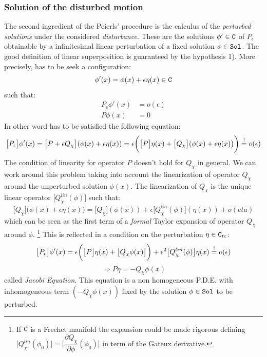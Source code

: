 \documentclass[Main]{subfiles}
\begin{document}
	\subsubsection{Solution of the disturbed motion}
		The second ingredient of the Peierls' procedure is the calculus of the \emph{perturbed solutions} under the considered \emph{disturbance}.
		 These are the solutions $\phi'\in \mathtt{C}$ of $P_\epsilon$ obtainable by a infinitesimal linear perturbation of a fixed solution $\phi \in \mathtt{Sol}$. The good definition of linear superposition is guaranteed by the hypothesis 1).
		More precisely, has to be seek a configuration:
			\begin{displaymath}
					\phi'(x) = \phi(x) + \epsilon \eta(x) \in \mathtt{C}
			\end{displaymath}
		such that:
			\begin{align*} 
				P_\epsilon \phi'(x) &= o(\epsilon)  \\ 
				P \phi(x) &= 0
			\end{align*}
		In other word has to be satisfied the following equation:
		\begin{displaymath}
			\big[P_\epsilon\big] \phi'(x) = \big[ P + \epsilon Q_\chi		\big]( \phi(x) + \epsilon \eta(x)) 
			= \epsilon \biggr( \big[P\big] \eta(x) + \big[Q_\chi \big]( \phi(x) + \epsilon \eta(x)\big)\biggr) \overset{!}{=} o(\epsilon)			
		\end{displaymath}
		The condition of linearity for operator $P$ doesn't hold for $Q_\chi$ in general.
		We can work around this problem taking into account the linearization\cite[pag. 31]{Khavkine2014} of operator $Q_\chi$ around the unperturbed solution $\phi(x)$. 
		The linearization of $Q_\chi$ is the unique linear operator $\big[Q_\chi^{lin}(\phi) \big]$ such that:
		\begin{displaymath}
			\big[Q_\chi \big]( \phi(x) + \epsilon \eta(x)\big)= \big[Q_\chi \big]( \phi(x)) + \epsilon \big[Q_\chi^{lin}(\phi)  \big]( \eta(x)) + o(eta)
		\end{displaymath}
		which can be seen as the first term of a \emph{formal} Taylor expansion of operator $Q_\chi$ around $\phi$.
		\danger\footnote{If $\mathtt{C}$ is a Frechet manifold the expansion could be made rigorous defining $\big[Q_\chi^{lin}(\phi_0)  \big] = \big[\dfrac{\partial Q_\chi}{\partial \phi} (\phi_0)\big] $ in term of the Gateux derivative.}
		This is reflected in a condition on the perturbation $\eta \in \mathtt{C}_{tc}$:
		\begin{displaymath}
			\big[P_\epsilon\big] \phi'(x) =  \epsilon \biggr( \big[P\big] \eta(x) + \big[Q_\chi \phi(x) \big]\biggr)+ \epsilon^2 \big[Q_\chi^{lin}(\phi)  \big]	\eta(x) \overset{!}{=} o(\epsilon)
		\end{displaymath}
		\begin{equation}\label{PeierlJacobiEqLin}
			\Rightarrow P \eta = - Q_\chi \phi(x)
		\end{equation}
		called \emph{Jacobi Equation}.
		This equation is a non homogeneous P.D.E. with inhomogeneous term $ (- Q_\chi \phi(x))$ fixed by the solution $\phi\in \mathtt{Sol}$ to be perturbed.
\end{document}
